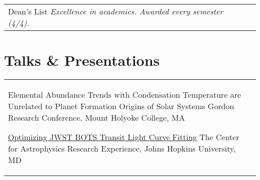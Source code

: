 \begin{paracol}{1}
\begin{supertabular}{L{4cm}@{\hskip 0.3in}L{13cm}}
                                                                            {Dean's List}
                                                                            {\textit{Excellence in academics. Awarded every semester (4/4).}}
  \end{supertabular}






  \section{Talks \& Presentations}






  \begin{supertabular}{L{4cm}@{\hskip 0.3in}L{13cm}}
              {{Elemental Abundance Trends with Condensation Temperature are Unrelated to Planet Formation}}
              {Origins of Solar Systems Gordon Research Conference, Mount Holyoke College, MA}

                        {\href{https://sites.krieger.jhu.edu/jhu-care/summer-2022/}{Optimizing JWST BOTS Transit Light Curve Fitting}}
                        {The Center for Astrophysics Research Experience, Johns Hopkins University, MD}
  \end{supertabular}






\end{paracol}
